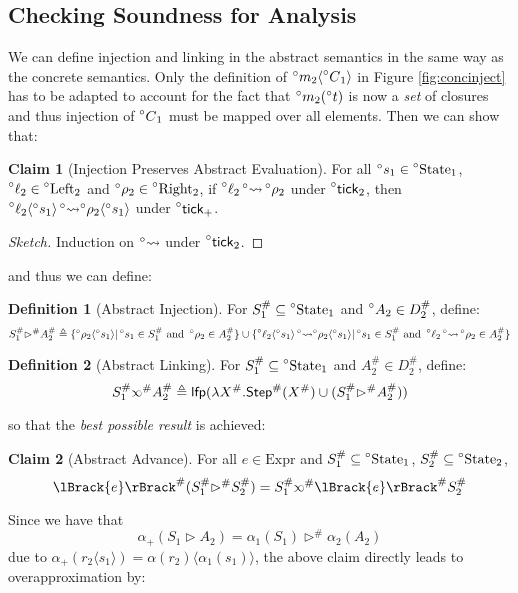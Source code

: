\documentclass{article}
\theoremstyle{definition}
\newtheorem{definition}{Definition}[section]
\newtheorem{clm}{Claim}[section]
\newcommand*{\A}[1]{\prescript{\circ}{}{#1}}
\newcommand*{\Abs}[1]{{#1}^{\#}}
\newcommand*{\Expr}{\text{Expr}}
\newcommand*{\Left}{\text{Left}}
\newcommand*{\Right}{\text{Right}}
\newcommand*{\mem}{m}
\newcommand*{\State}{\text{State}}
\newcommand*{\lfp}{\mathsf{lfp}}
\newcommand*{\Step}{\mathsf{Step}}
\newcommand*{\semarrow}{\rightsquigarrow}
\newcommand*{\semlink}{\mathbin{\rotatebox[origin=c]{180}{$\propto$}}}
\newcommand*{\sembracket}[1]{\lBrack{#1}\rBrack}
\newcommand*{\tick}{\mathsf{tick}}
\newcommand*{\inject}[2]{{#2}\langle{#1}\rangle}
\begin{document}
\subsection{Checking Soundness for Analysis}
We can define injection and linking in the abstract semantics in the same way as the concrete semantics.
Only the definition of $\inject{\A{C}_1}{\A\mem_2}$ in Figure \ref{fig:concinject} has to be adapted to account for the fact that $\A\mem_2(\A{t})$ is now a \emph{set} of closures and thus injection of $\A{C}_1$ must be mapped over all elements.
Then we can show that:
\begin{clm}[Injection Preserves Abstract Evaluation]
  For all $\A{s}_1\in\A\State_1$, $\A\ell_2\in\A\Left_2$ and $\A\rho_2\in\A\Right_2$, if $\A\ell_2\A\semarrow\A\rho_2$ under $\A\tick_2$,
  then $\inject{\A{s}_1}{\A\ell_2}\A\semarrow\inject{\A{s}_1}{\A\rho_2}$ under $\A\tick_+$.
\end{clm}
\begin{proof}[Sketch]
  Induction on $\A\semarrow$ under $\A\tick_2$.
\end{proof}
and thus we can define:
\begin{definition}[Abstract Injection]
  For $\Abs{S}_1\subseteq\A\State_1$ and $\A{A}_2\in\Abs{D}_2$, define:
  \[
    \Abs{S}_1\Abs\rhd\Abs{A}_2\triangleq\{\inject{\A{s}_1}{\A\rho_2}|\A{s}_1\in\Abs{S}_1\text{ and }\A\rho_2\in\Abs{A}_2\}\cup\{\inject{\A{s}_1}{\A\ell_2}\A\semarrow\inject{\A{s}_1}{\A\rho_2}|\A{s}_1\in\Abs{S}_1\text{ and }\A\ell_2\A\semarrow\A\rho_2\in\Abs{A}_2\}
  \]
\end{definition}
\begin{definition}[Abstract Linking]
  For $\Abs{S}_1\subseteq\A\State_1$ and $\Abs{A}_2\in\Abs{D}_2$, define:
  \[
    \Abs{S}_1\Abs\semlink\Abs{A}_2\triangleq\lfp(\lambda\Abs{X}.\Abs\Step(\Abs{X})\cup(\Abs{S}_1\Abs\rhd\Abs{A}_2))
  \]
\end{definition}
so that the \emph{best possible result} is achieved:
\begin{clm}[Abstract Advance]
  For all $e\in\Expr$ and $\Abs{S}_1\subseteq\A\State_1$, $\Abs{S}_2\subseteq\A\State_2$,
  \[
    \Abs{\sembracket{e}}(\Abs{S}_1\Abs\rhd\Abs{S}_2)=\Abs{S}_1\Abs\semlink\Abs{\sembracket{e}}\Abs{S}_2
  \]
\end{clm}
Since we have that
\[
  \alpha_+(S_1\rhd A_2)=\alpha_1(S_1)\Abs\rhd\alpha_2(A_2)
\]
due to $\alpha_+(\inject{s_1}{r_2})=\inject{\alpha_1(s_1)}{\alpha(r_2)}$, the above claim directly leads to overapproximation by:
\end{document}
